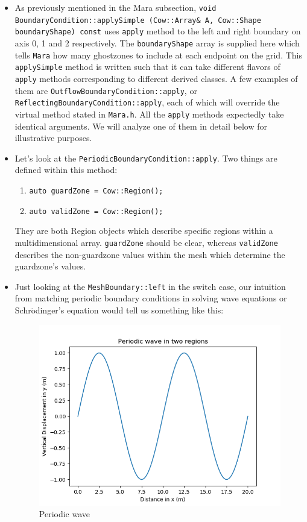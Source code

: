 \documentclass{article}
\begin{document}
\begin{itemize}
	
	\item As previously mentioned in the Mara subsection, \texttt{void BoundaryCondition::applySimple (Cow::Array\& A, Cow::Shape boundaryShape) const} uses \texttt{apply} method to the left and right boundary on axis 0, 1 and 2 respectively. The \texttt{boundaryShape} array is supplied here which tells \texttt{Mara} how many ghostzones to include at each endpoint on the grid. This \texttt{applySimple} method is written such that it can take different flavors of \texttt{apply} methods corresponding to different derived classes. A few examples of them are \texttt{OutflowBoundaryCondition::apply}, or \texttt{ReflectingBoundaryCondition::apply}, each of which will override the virtual method stated in \texttt{Mara.h}. All the \texttt{apply} methods expectedly take identical arguments. We will analyze one of them in detail below for illustrative purposes.
	\item Let's look at the \texttt{PeriodicBoundaryCondition::apply}. Two things are defined within this method:
	\begin{enumerate}
		\item \texttt{auto guardZone = Cow::Region();}
		\item \texttt{auto validZone = Cow::Region();}
	\end{enumerate}
	They are both Region objects which describe specific regions within a multidimensional array. \texttt{guardZone} should be clear, whereas \texttt{validZone} describes the non-guardzone values within the mesh which determine the guardzone's values.
	\item Just looking at the \texttt{MeshBoundary::left} in the switch case, our intuition from matching periodic boundary conditions in solving wave equations or Schr$\ddot{\text{o}}$dinger's equation would tell us something like this: 
	
	\begin{figure}[H]
		\includegraphics[scale=0.5]{./Wave.png}
		\caption{Periodic wave}
	\end{figure}
	

\end{itemize}
\end{document}
